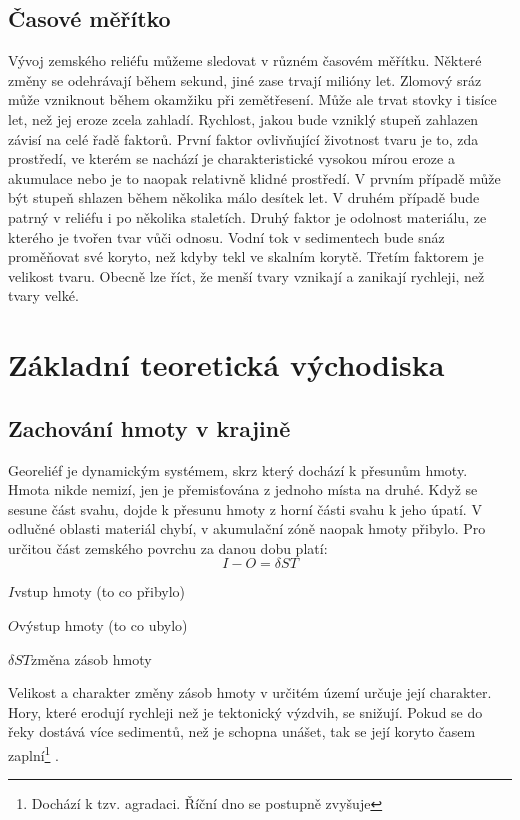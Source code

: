 \subsection{Časové měřítko}
Vývoj zemského reliéfu můžeme sledovat v různém časovém měřítku. Některé změny se odehrávají během sekund, jiné zase trvají milióny let. Zlomový sráz může vzniknout během okamžiku při zemětřesení. Může ale trvat stovky i tisíce let, než jej eroze zcela zahladí. Rychlost, jakou bude vzniklý stupeň zahlazen závisí na celé řadě faktorů. První faktor ovlivňující životnost tvaru je to, zda prostředí, ve kterém se nachází je charakteristické vysokou mírou eroze a akumulace nebo je to naopak relativně klidné prostředí. V prvním případě může být stupeň shlazen během několika málo desítek let. V druhém případě bude patrný v reliéfu i po několika staletích. Druhý faktor je odolnost materiálu, ze kterého je tvořen tvar vůči odnosu. Vodní tok v sedimentech bude snáz proměňovat své koryto, než kdyby tekl ve skalním korytě. Třetím faktorem je velikost tvaru. Obecně lze říct, že menší tvary vznikají a zanikají rychleji, než tvary velké. 

\section{Základní teoretická východiska}

\subsection{Zachování hmoty v krajině}
Georeliéf je dynamickým systémem, skrz který dochází k přesunům hmoty. Hmota nikde nemizí, jen je přemisťována z jednoho místa na druhé. Když se sesune část svahu, dojde k přesunu hmoty z horní části svahu k jeho úpatí. V odlučné oblasti materiál chybí, v akumulační zóně naopak hmoty přibylo. Pro určitou část zemského povrchu za danou dobu platí: 
\begin{equation}\label{key}
	I-O=\delta ST	
\end{equation}
\begin{eqexpl}
	\item{$I$}vstup hmoty (to co přibylo)
	\item{$O$}výstup hmoty (to co ubylo)
	\item{$\delta ST$}změna zásob hmoty
\end{eqexpl}

Velikost a charakter změny zásob hmoty v určitém území určuje její charakter. Hory, které erodují rychleji než je tektonický výzdvih, se snižují. Pokud se do řeky dostává více sedimentů, než je schopna unášet, tak se její koryto časem zaplní\footnote*{Dochází k tzv. agradaci. Říční dno se postupně zvyšuje} \parencite{biermanKeyConceptsGeomorphology2014}.

